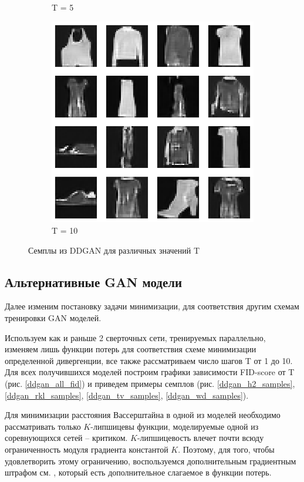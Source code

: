 \documentclass{article}
\begin{document}
\begin{figure}[H]
\begin{subfigure}[h]{0.3\linewidth}
		\caption{T = 5}
	\end{subfigure}
	\hfill
	\begin{subfigure}[h]{0.3\linewidth}
		\centering
		\includegraphics[scale=0.3]{../code/figures/generated_DDGAN_10.png}
		\caption{T = 10}
	\end{subfigure}
	\caption{Семплы из DDGAN для различных значений T}\label{ddgan_samples}	
\end{figure}

\subsection{Альтернативные GAN модели}

Далее изменим постановку задачи минимизации, для соответствия другим схемам тренировки GAN моделей. 

Используем как и раньше 2 сверточных сети, тренируемых параллельно, изменяем лишь функции потерь для соответствия схеме минимизации определенной дивергенции, все также рассматриваем число шагов T от 1 до 10. Для всех получившихся моделей построим графики зависимости FID-score от T (рис. \ref{ddgan_all_fid}) и приведем примеры семплов (рис. \ref{ddgan_h2_samples}, \ref{ddgan_rkl_samples}, \ref{ddgan_tv_samples}, \ref{ddgan_wd_samples}).

Для минимизации расстояния Вассерштайна в одной из моделей необходимо рассматривать только $K$-липшицевы функции, моделируемые одной из соревнующихся сетей -- критиком. $K$-липшицевость влечет почти всюду ограниченность модуля градиента константой $K$. Поэтому, для того, чтобы удовлетворить этому ограничению, воспользуемся дополнительным градиентным штрафом см. \cite{DBLP:journals/corr/GulrajaniAADC17}, который есть дополнительное слагаемое в функции потерь. 
\end{document}

